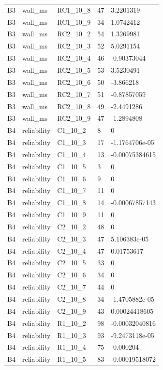 \begin{longtable}{lllll}
B3 & wall\_ms & RC1\_10\_8 & 47 & 3.2201319 \\
B3 & wall\_ms & RC1\_10\_9 & 34 & 1.0742412 \\
B3 & wall\_ms & RC2\_10\_2 & 54 & 1.3269981 \\
B3 & wall\_ms & RC2\_10\_3 & 52 & 5.0291154 \\
B3 & wall\_ms & RC2\_10\_4 & 46 & -0.90373044 \\
B3 & wall\_ms & RC2\_10\_5 & 53 & 3.5230491 \\
B3 & wall\_ms & RC2\_10\_6 & 50 & -3.866218 \\
B3 & wall\_ms & RC2\_10\_7 & 51 & -0.87857059 \\
B3 & wall\_ms & RC2\_10\_8 & 49 & -2.4491286 \\
B3 & wall\_ms & RC2\_10\_9 & 47 & -1.2894808 \\
B4 & reliability & C1\_10\_2 & 8 & 0 \\
B4 & reliability & C1\_10\_3 & 17 & -1.1764706e-05 \\
B4 & reliability & C1\_10\_4 & 13 & -0.00075384615 \\
B4 & reliability & C1\_10\_5 & 3 & 0 \\
B4 & reliability & C1\_10\_6 & 9 & 0 \\
B4 & reliability & C1\_10\_7 & 11 & 0 \\
B4 & reliability & C1\_10\_8 & 14 & -0.00067857143 \\
B4 & reliability & C1\_10\_9 & 11 & 0 \\
B4 & reliability & C2\_10\_2 & 48 & 0 \\
B4 & reliability & C2\_10\_3 & 47 & 5.106383e-05 \\
B4 & reliability & C2\_10\_4 & 47 & 0.01753617 \\
B4 & reliability & C2\_10\_5 & 33 & 0 \\
B4 & reliability & C2\_10\_6 & 34 & 0 \\
B4 & reliability & C2\_10\_7 & 44 & 0 \\
B4 & reliability & C2\_10\_8 & 34 & -1.4705882e-05 \\
B4 & reliability & C2\_10\_9 & 43 & 0.00024418605 \\
B4 & reliability & R1\_10\_2 & 98 & -0.00032040816 \\
B4 & reliability & R1\_10\_3 & 93 & -9.2473118e-05 \\
B4 & reliability & R1\_10\_4 & 75 & -0.000204 \\
B4 & reliability & R1\_10\_5 & 83 & -0.00019518072 \\

\end{longtable}
